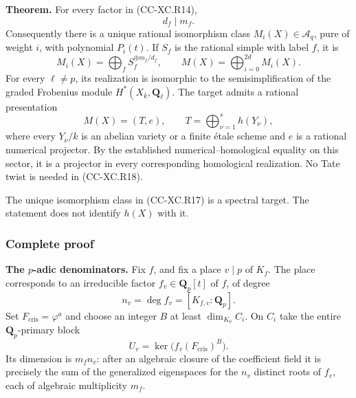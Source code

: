 \textbf{Theorem.} For every factor in (CC-XC.R14), \[
                         d_f\mid m_f.                  \tag{CC-XC.R16}
\] Consequently there is a unique rational isomorphism class
\(M_i(X)\in\mathcal A_q\), pure of weight \(i\), with polynomial
\(P_i(t)\). If \(S_f\) is the rational simple with label \(f\), it is \[
 M_i(X)=\bigoplus_f S_f^{\oplus m_f/d_f},\qquad
 M(X)=\bigoplus_{i=0}^{2d}M_i(X).
                                                        \tag{CC-XC.R17}
\] For every \(\ell\ne p\), its realization is isomorphic to the
semisimplification of the graded Frobenius module \(H^*(X_{\bar k},
\mathbf Q_\ell)\). The target admits a rational presentation \[
 M(X)=(T,e),\qquad
 T=\bigoplus_{\nu=1}^{s}h(Y_\nu),
                                                        \tag{CC-XC.R18}
\] where every \(Y_\nu/k\) is an abelian variety or a finite étale
scheme and \(e\) is a rational numerical projector. By the established
numerical--homological equality on this sector, it is a projector in
every corresponding homological realization. No Tate twist is needed in
(CC-XC.R18).

The unique isomorphism class in (CC-XC.R17) is a spectral target. The
statement does not identify \(h(X)\) with it.

\subsubsection{Complete proof}\label{complete-proof}

\textbf{The \(p\)-adic denominators.} Fix \(f\), and fix a place
\(v\mid p\) of \(K_f\). The place corresponds to an irreducible factor
\(f_v\in\mathbf Q_p[t]\) of \(f\), of degree \[
 n_v=\deg f_v=[K_{f,v}:\mathbf Q_p].
\] Set \(F_{\mathrm{cris}}=\varphi^a\) and choose an integer \(B\) at
least \(\dim_{K_0} C_i\). On \(C_i\) take the entire
\(\mathbf Q_p\)-primary block \[
 U_v=\ker\bigl(f_v(F_{\mathrm{cris}})^B\bigr).
                                                        \tag{CC-XC.R19}
\] Its dimension is \(m_f n_v\): after an algebraic closure of the
coefficient field it is precisely the sum of the generalized eigenspaces
for the \(n_v\) distinct roots of \(f_v\), each of algebraic
multiplicity \(m_f\).

